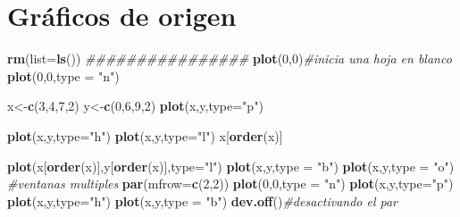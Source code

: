 \documentclass[
]{book}
\newenvironment{Shaded}{\begin{snugshade}}{\end{snugshade}}
\newcommand{\CommentTok}[1]{\textcolor[rgb]{0.56,0.35,0.01}{\textit{#1}}}
\newcommand{\DataTypeTok}[1]{\textcolor[rgb]{0.13,0.29,0.53}{#1}}
\newcommand{\DecValTok}[1]{\textcolor[rgb]{0.00,0.00,0.81}{#1}}
\newcommand{\KeywordTok}[1]{\textcolor[rgb]{0.13,0.29,0.53}{\textbf{#1}}}
\newcommand{\NormalTok}[1]{#1}
\newcommand{\StringTok}[1]{\textcolor[rgb]{0.31,0.60,0.02}{#1}}
\begin{document}
\hypertarget{gruxe1ficos-de-origen}{%
\section{Gráficos de origen}\label{gruxe1ficos-de-origen}}

\begin{Shaded}
\begin{Highlighting}[]
\KeywordTok{rm}\NormalTok{(}\DataTypeTok{list=}\KeywordTok{ls}\NormalTok{())}
\CommentTok{################}
\KeywordTok{plot}\NormalTok{(}\DecValTok{0}\NormalTok{,}\DecValTok{0}\NormalTok{)}\CommentTok{#inicia una hoja en blanco}
\KeywordTok{plot}\NormalTok{(}\DecValTok{0}\NormalTok{,}\DecValTok{0}\NormalTok{,}\DataTypeTok{type =} \StringTok{"n"}\NormalTok{)}

\NormalTok{x<-}\KeywordTok{c}\NormalTok{(}\DecValTok{3}\NormalTok{,}\DecValTok{4}\NormalTok{,}\DecValTok{7}\NormalTok{,}\DecValTok{2}\NormalTok{)}
\NormalTok{y<-}\KeywordTok{c}\NormalTok{(}\DecValTok{0}\NormalTok{,}\DecValTok{6}\NormalTok{,}\DecValTok{9}\NormalTok{,}\DecValTok{2}\NormalTok{)}
\KeywordTok{plot}\NormalTok{(x,y,}\DataTypeTok{type=}\StringTok{"p"}\NormalTok{)}

\KeywordTok{plot}\NormalTok{(x,y,}\DataTypeTok{type=}\StringTok{"h"}\NormalTok{)}
\KeywordTok{plot}\NormalTok{(x,y,}\DataTypeTok{type=}\StringTok{"l"}\NormalTok{)}
\NormalTok{x[}\KeywordTok{order}\NormalTok{(x)]}

\KeywordTok{plot}\NormalTok{(x[}\KeywordTok{order}\NormalTok{(x)],y[}\KeywordTok{order}\NormalTok{(x)],}\DataTypeTok{type=}\StringTok{"l"}\NormalTok{)}
\KeywordTok{plot}\NormalTok{(x,y,}\DataTypeTok{type =} \StringTok{"b"}\NormalTok{)}
\KeywordTok{plot}\NormalTok{(x,y,}\DataTypeTok{type =} \StringTok{"o"}\NormalTok{)}
\CommentTok{#ventanas multiples}
\KeywordTok{par}\NormalTok{(}\DataTypeTok{mfrow=}\KeywordTok{c}\NormalTok{(}\DecValTok{2}\NormalTok{,}\DecValTok{2}\NormalTok{))}
\KeywordTok{plot}\NormalTok{(}\DecValTok{0}\NormalTok{,}\DecValTok{0}\NormalTok{,}\DataTypeTok{type =} \StringTok{"n"}\NormalTok{)}
\KeywordTok{plot}\NormalTok{(x,y,}\DataTypeTok{type=}\StringTok{"p"}\NormalTok{)}
\KeywordTok{plot}\NormalTok{(x,y,}\DataTypeTok{type=}\StringTok{"h"}\NormalTok{)}
\KeywordTok{plot}\NormalTok{(x,y,}\DataTypeTok{type =} \StringTok{"b"}\NormalTok{)}
\KeywordTok{dev.off}\NormalTok{()}\CommentTok{#desactivando el par}


\end{Highlighting}
\end{Shaded}
\end{document}
